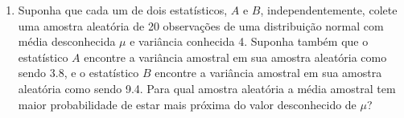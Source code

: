 \begin{enumerate}
    \item Suponha que cada um de dois estatísticos, $A$ e $B$, independentemente, colete uma amostra aleatória de 20 observações de uma distribuição normal com média desconhecida $\mu$ e variância conhecida 4. Suponha também que o estatístico $A$ encontre a variância amostral em sua amostra aleatória como sendo 3.8, e o estatístico $B$ encontre a variância amostral em sua amostra aleatória como sendo 9.4. Para qual amostra aleatória a média amostral tem maior probabilidade de estar mais próxima do valor desconhecido de $\mu$?

\end{enumerate}